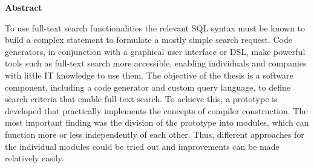 \begin{center}
    \Large
    \textbf{\myTitel}

    \vspace{0.4cm}
    \large
    \myAutor

    \vspace{0.9cm}
    \textbf{Abstract}
\end{center}
To use full-text search functionalities the relevant SQL syntax must be known to build a complex statement to formulate a mostly simple search request.
Code generators, in conjunction with a graphical user interface or DSL, make powerful tools such as full-text search more accessible, enabling individuals and companies with little IT knowledge to use them.
The objective of the thesis is a software component, including a code generator and custom query language, to define search criteria that enable full-text search.
To achieve this, a prototype is developed that practically implements the concepts of compiler construction.
The most important finding was the division of the prototype into modules, which can function more or less independently of each other.
Thus, different approaches for the individual modules could be tried out and improvements can be made relatively easily.
\newpage